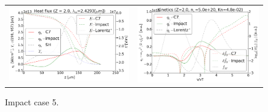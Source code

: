 \begin{figure}[tbh]
  \begin{center}
    \begin{tabular}{cc}
      \includegraphics[width=\figscale\textwidth]{../VFPdata/C7_Impact_case5_heatflux.png} &
      \includegraphics[width=\figscale\textwidth]{../VFPdata/C7_Impact_case5_kinetics.png}
    \end{tabular}
  \caption{  
  Impact case 5.}
  \end{center}
  \label{fig:C7_Impact_case1}
\end{figure}

\clearpage
